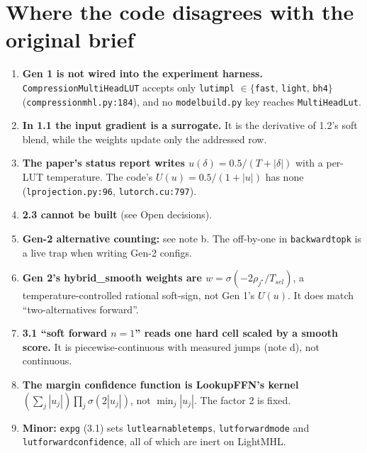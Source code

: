 \documentclass[10pt]{article}
\newcommand{\code}[1]{{\renewcommand{\_}{\textunderscore\allowbreak}\texttt{#1}}}
\begin{document}
\section*{Where the code disagrees with the original brief}
\begin{enumerate}\setlength\itemsep{1pt}
\item \textbf{Gen 1 is not wired into the experiment harness.} \code{CompressionMultiHeadLUT} accepts only \code{lut\_impl} $\in\{$\code{fast}, \code{light}, \code{bh4}$\}$ (\code{compression\_mhl.py:184}),
  and no \code{model\_build.py} key reaches \code{MultiHeadLut}.
\item \textbf{In 1.1 the input gradient is a surrogate.} It is the derivative of 1.2's soft blend, while the weights update only the addressed row.
\item \textbf{The paper's status report writes $u(\delta)=0.5/(T+|\delta|)$} with a per-LUT temperature. The code's $U(u)=0.5/(1+|u|)$ has none
  (\code{l\_projection.py:96}, \code{lutorch.cu:797}).
\item \textbf{2.3 cannot be built} (see Open decisions).
\item \textbf{Gen-2 alternative counting:} see note b. The off-by-one in \code{backward\_topk} is a live trap when writing Gen-2 configs.
\item \textbf{Gen 2's hybrid\_smooth weights are $w=\sigma(-2\rho_{j^\star}/T_{sel})$}, a temperature-controlled rational soft-sign, not Gen 1's $U(u)$. It does match ``two-alternatives forward''.
\item \textbf{3.1 ``soft forward $n{=}1$'' reads one hard cell scaled by a smooth score.} It is piecewise-continuous with measured jumps (note d), not continuous.
\item \textbf{The margin confidence function is LookupFFN's kernel} $(\sum_j|u_j|)\prod_j\sigma(2|u_j|)$, not $\min_j|u_j|$. The factor 2 is fixed.
\item \textbf{Minor:} \code{exp\_g\_0193} (3.1) sets \code{lut\_learnable\_temps}, \code{lut\_forward\_mode} and \code{lut\_forward\_confidence}, all of which are inert on LightMHL.
\end{enumerate}
\end{document}
